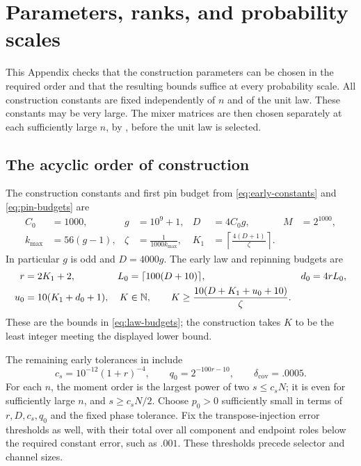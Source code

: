 \section{Parameters, ranks, and probability scales}
\label{sec:parameters}

This Appendix checks that the construction parameters can be chosen
in the required order and that the resulting bounds suffice at every
probability scale. All construction constants are fixed independently
of \(n\) and of the unit law. These constants may be very large.
The mixer matrices are then chosen separately at each sufficiently
large \(n\), by , before the unit law is selected.

\subsection{The acyclic order of construction}

The construction constants and first pin budget from
\eqref{eq:early-constants} and \eqref{eq:pin-budgets} are
\begin{align}
 C_0&=1000,& g&=10^9+1,&
 D&=4C_0g,& M&=2^{1000},\nonumber\\
 k_{\max}&=56(g-1),&
 \zeta&=\frac{1}{1000k_{\max}},&
 K_1&=\left\lceil\frac{4(D+1)}{\zeta}\right\rceil .
 \label{eq:ledger-early}
\end{align}
In particular \(g\) is odd and \(D=4000g\).
The early law and repinning budgets are
\begin{align}
 r&=2K_1+2,&
 L_0&=\lceil100(D+10)\rceil,&
 d_0&=4rL_0,\nonumber\\
 u_0&=10(K_1+d_0+1),&
 K&\in\mathbb N,\qquad
 K\ge\frac{10(D+K_1+u_0+10)}{\zeta}.
 \label{eq:ledger-law}
\end{align}
These are the bounds in \eqref{eq:law-budgets}; the construction
takes \(K\) to be the least integer meeting the displayed lower bound.

The remaining early tolerances in
 include
\begin{equation}
 c_s=10^{-12}(1+r)^{-4},\qquad
 q_0=2^{-100r-10},\qquad
 \delta_{\mathrm{cov}}=.0005.
 \label{eq:ledger-cover-tolerances}
\end{equation}
For each \(n\), the moment order is the largest power of two
\(s\le c_sN\); it is even for sufficiently large \(n\), and
\(s\ge c_sN/2\).
Choose \(p_0>0\) sufficiently small in terms of \(r,D,c_s,q_0\)
and the fixed phase tolerance. Fix the transpose-injection error
thresholds as well, with their total over all component and endpoint
roles below the required constant error, such as \(.001\).
These thresholds precede selector and channel sizes.

